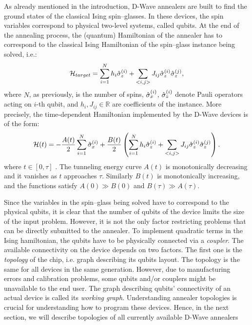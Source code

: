 As already mentioned in the introduction, D-Wave annealers are built to find
the ground states of the classical Ising spin--glasses. In these devices, the
spin variables correspond to physical two-level systems, called qubits. At the
end of the annealing process, the (quantum) Hamiltonian of the annealer has to
correspond to the classical Ising Hamiltonian of the spin--glass instance being
solved, i.e.:
\begin{equation}
  \mathcal{H}_{target} = \sum_{i=1}^N h_i \hat{\sigma}^{(i)}_z + \sum_{<i, j>} J_{ij} \hat{\sigma}^{(i)}_z \hat{\sigma}^{(j)}_z,
\end{equation}
where $N$, as previously, is the number of spins, $\hat{\sigma}^{(i)}_x$,
$\hat{\sigma}^{(i)}_z$ denote Pauli operators acting on $i$-th qubit, and $h_i,
  J_{ij} \in \mathbb{R}$ are coefficients of the instance. More precisely, the
time-dependent Hamiltonian implemented by the D-Wave devices is of the form:
\begin{equation}
  \label{eq:dwaveham}
  \mathcal{H}(t) =  -\frac{A(t)}{2}\sum_{i=1}^N \hat{\sigma}^{(i)}_x + \frac{B(t)}{2}\left(\sum_{i=1}^N h_i \hat{\sigma}^{(i)}_z + \sum_{<i, j>} J_{ij} \hat{\sigma}^{(i)}_z \hat{\sigma}^{(j)}_z\right).
\end{equation}
where $t \in [0, \tau]$ \cite{dwavedocs}. The tunneling energy curve $A(t)$ is
monotonically decreasing and it vanishes as $t$ approaches $\tau$. Similarly
$B(t)$ is monotonically increasing, and the functions satisfy $A(0) \gg B(0)$
and $B(\tau) \gg A(\tau)$.

Since the variables in the spin--glass being solved have to correspond to the
physical qubits, it is clear that the number of qubits of the device limits the
size of the input problem. However, it is not the only factor restricting
problems that can be directly submitted to the annealer. To implement quadratic
terms in the Ising hamiltonian, the qubits have to be physically connected via
a \emph{coupler}. The available connectivity on the device depends on two
factors. The first one is the \emph{topology} of the chip, i.e. graph
describing its qubits layout. The topology is the same for all devices in the
same generation. However, due to manufacturing errors and calibration problems,
some qubits and/or couplers might be unavailable to the end user. The graph
describing qubits' connectivity of an actual device is called its \emph{working
  graph}. Understanding annealer topologies is crucial for understanding how to
program these devices. Hence, in the next section, we will describe topologies
of all currently available D-Wave annealers

